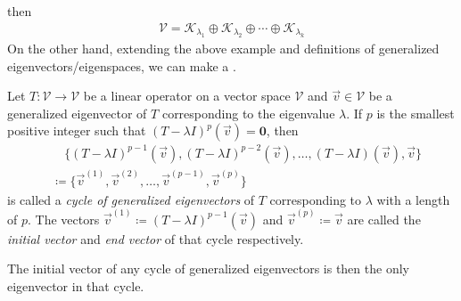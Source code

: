 then
\begin{align}
\mathcal{V} = \mathcal{K}_{\lambda_1} \oplus \mathcal{K}_{\lambda_2} \oplus \cdots \oplus \mathcal{K}_{\lambda_k} \label{eqn:VKKK}
\end{align} 
On the other hand, extending the above example and definitions of generalized eigenvectors/eigenspaces, we can make a .
\begin{defn}
Let $T: \mathcal{V} \to \mathcal{V}$ be a linear operator on a vector space $\mathcal{V}$ and $\vec{v} \in \mathcal{V}$ be a generalized eigenvector of $T$ corresponding to the eigenvalue $\lambda$. If $p$ is the smallest positive integer such that $(T-\lambda I)^p (\vec{v}) = \textbf{0}$, then
\begin{align}
&\quad \{(T-\lambda I)^{p-1}(\vec{v}), (T-\lambda I)^{p-2}(\vec{v}), \ldots, (T-\lambda I)(\vec{v}),\vec{v}\} \label{eqn:B6}\\
&\coloneqq \{\vec{v}^{(1)}, \vec{v}^{(2)}, \ldots, \vec{v}^{(p-1)}, \vec{v}^{(p)}\} \nonumber
\end{align}
is called a \textit{cycle of generalized eigenvectors} of $T$ corresponding to $\lambda$ with a length of $p$. The vectors $\vec{v}^{(1)} \coloneqq (T-\lambda I)^{p-1}(\vec{v})$ and $\vec{v}^{(p)} \coloneqq \vec{v}$ are called the \textit{initial vector} and \textit{end vector} of that cycle respectively.
\end{defn}
The initial vector of any cycle of generalized eigenvectors is then the only eigenvector in that cycle.\par

